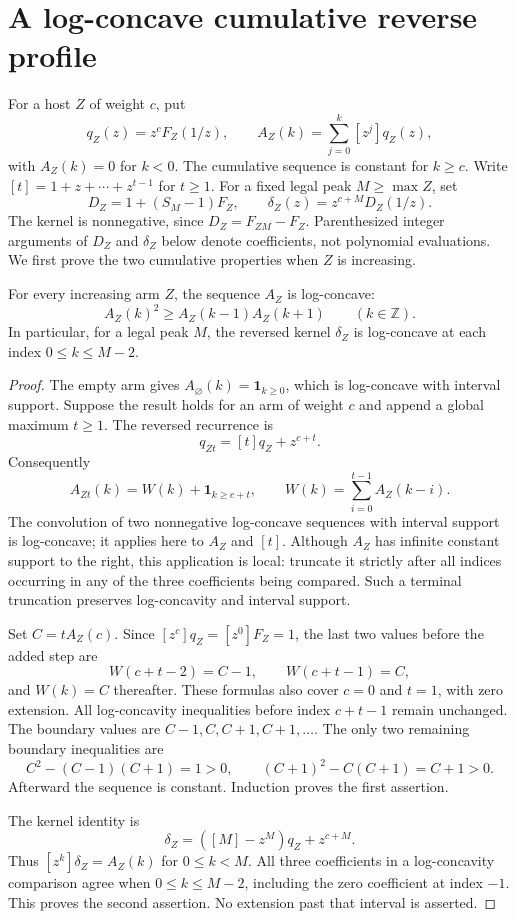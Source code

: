 \section{A log-concave cumulative reverse profile}

For a host $Z$ of weight $c$, put
\[
 q_Z(z)=z^cF_Z(1/z),\qquad
 A_Z(k)=\sum_{j=0}^k[z^j]q_Z(z),
\]
with $A_Z(k)=0$ for $k<0$. The cumulative sequence is constant for $k\ge c$.
Write $[t]=1+z+\cdots+z^{t-1}$ for $t\ge1$. For a fixed
legal peak $M\ge\max Z$, set
\[
 D_Z=1+(S_M-1)F_Z,\qquad
 \delta_Z(z)=z^{c+M}D_Z(1/z).
\]
The kernel is nonnegative, since $D_Z=F_{ZM}-F_Z$.
Parenthesized integer arguments of $D_Z$ and $\delta_Z$ below denote
coefficients, not polynomial evaluations. We first prove the two
cumulative properties when $Z$ is increasing.

\begin{theorem}
For every increasing arm $Z$, the sequence $A_Z$ is log-concave:
\[
 A_Z(k)^2\ge A_Z(k-1)A_Z(k+1)\qquad(k\in\mathbb Z).
\]
In particular, for a legal peak $M$, the reversed kernel $\delta_Z$ is
log-concave at each index $0\le k\le M-2$.
\end{theorem}

\begin{proof}
The empty arm gives $A_\varnothing(k)=\mathbf1_{k\ge0}$, which is
log-concave with interval support. Suppose the result holds for an arm of
weight $c$ and append a global maximum $t\ge1$. The reversed recurrence is
\[
 q_{Zt}=[t]q_Z+z^{c+t}.
\]
Consequently
\[
 A_{Zt}(k)=W(k)+\mathbf1_{k\ge c+t},\qquad
 W(k)=\sum_{i=0}^{t-1}A_Z(k-i).
\]
The convolution of two nonnegative log-concave sequences with interval
support is log-concave; it applies here to $A_Z$ and $[t]$. Although $A_Z$
has infinite constant support to the right, this application is local:
truncate it strictly after all indices occurring in any of the three
coefficients being compared. Such a terminal truncation preserves
log-concavity and interval support.

Set $C=tA_Z(c)$. Since $[z^c]q_Z=[z^0]F_Z=1$, the last two values before
the added step are
\[
 W(c+t-2)=C-1,\qquad W(c+t-1)=C,
\]
and $W(k)=C$ thereafter. These formulas also cover $c=0$ and $t=1$, with
zero extension. All log-concavity inequalities before index $c+t-1$
remain unchanged. The boundary values are $C-1,C,C+1,C+1,\ldots$.
The only two remaining boundary inequalities are
\[
 C^2-(C-1)(C+1)=1>0,\qquad
 (C+1)^2-C(C+1)=C+1>0.
\]
Afterward the sequence is constant. Induction proves the first assertion.

The kernel identity is
\[
 \delta_Z=([M]-z^M)q_Z+z^{c+M}.
\]
Thus $[z^k]\delta_Z=A_Z(k)$ for $0\le k<M$. All three coefficients in a
log-concavity comparison agree when $0\le k\le M-2$, including the zero
coefficient at index $-1$. This proves the second assertion. No extension
past that interval is asserted.
\end{proof}

